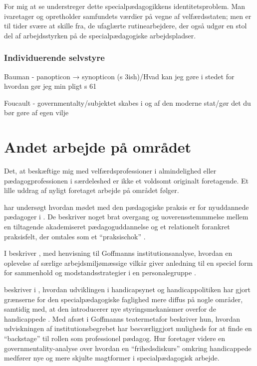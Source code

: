 For mig at se understreger dette specialpædagogikkens identitetsproblem.
Man ivaretager og opretholder samfundets værdier på vegne af velfærdsstaten; men er til tider svære at skille fra, de ufaglærte rutinearbejdere, der også udgør en stol del af arbejdsstyrken på de specialpædagogiske arbejdspladser. 

\subsubsection{Individuerende selvstyre}
Bauman - panopticon → synopticon (s 3ish)/Hvad kan jeg gøre i stedet for hvordan gør jeg min pligt s 61

Foucault - governmentalty/subjektet skabes i og af den moderne stat/gør det du bør gøre af egen vilje

\section{Andet arbejde på området}
Det, at beskæftige mig med velfærdsprofessioner i almindelighed eller pædagogprofessionen i særdeleshed er ikke et voldsomt originalt foretagende.
Et lille uddrag af nyligt foretaget arbejde på området følger.

\citeauthor{nielsenAttraktivPaPapiret2017} har undersøgt hvordan mødet med den pædagogiske praksis er for nyuddannede pædagoger i .
De beskriver noget brat overgang og uoverensstemmmelse mellem en tiltagende akademiseret pædagoguddannelse og et relationelt forankret praksisfelt, der omtales som et “praksischok” \autocite{nielsenAttraktivPaPapiret2017}.

I  beskriver \citeauthor{dreyerespersenBekymrendeIdentiteterAnbragte2010}, med henvisning til Goffmanns institutionsanalyse, hvordan en oplevelse af særlige arbejdsmiljømæssige vilkår giver anledning til en speciel form for sammenhold og modstandsstrategier i en personalegruppe \autocite{dreyerespersenBekymrendeIdentiteterAnbragte2010}.

\citeauthor{hurFrigorelsensMagt2015} beskriver i , hvordan udviklingen i handicapsynet og handicappolitiken har gjort grænserne for den specialpædagogiske faglighed mere diffus på nogle områder, samtidig med, at den introducerer nye styringsmekanismer overfor de handicappede \autocite{hurFrigorelsensMagt2015}.
Med afsæt i Goffmanns teatermetafor beskriver hun, hvordan udviskningen af institutionsbegrebet har besværliggjort muligheds for at finde en “backstage” til rollen som professionel pædagog.
Hur foretager videre en governmentality-analyse over hvordan en “frihedsdiskurs” omkring handicappede medfører nye og mere skjulte magtformer i specialpædagogisk arbejde.

